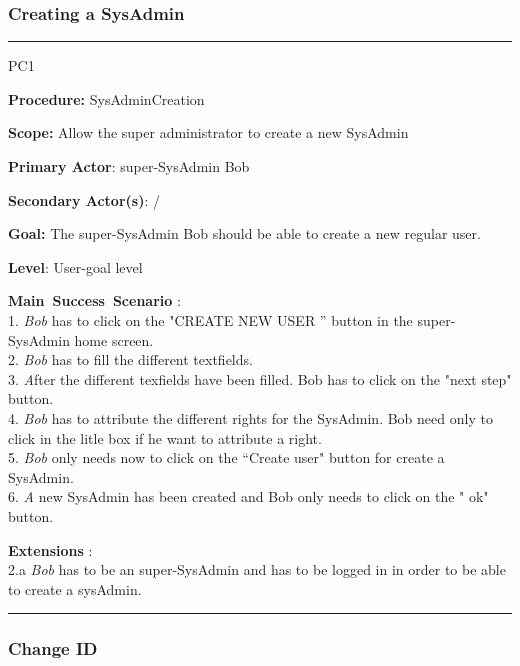 \subsubsection{Creating a SysAdmin}

\hrule
\vspace{0.5cm}
\begin{lyxlist}{PC1}
\small{
\item [\textbf{Procedure:}] SysAdminCreation 
\item [\textbf{Scope:}] Allow the super administrator to create a new SysAdmin
\item [\textbf{Primary Actor}:] super-SysAdmin Bob
\item [\textbf{Secondary Actor(s)}:] /
\item [\textbf{Goal:}] The super-SysAdmin Bob should be able to create a new
regular user.
\item [\textbf{Level}:] User-goal level
\item [\textbf{Main~Success~Scenario}]:\\
1. \emph{Bob} has to click on the "CREATE NEW USER '' button in the super-SysAdmin home
screen.\\
2. \emph{Bob} has to fill the different textfields.\\
3. \emph After the different texfields have been filled. {Bob} has to click on
the "next step" button.\\
4. \emph{Bob} has to attribute the different rights for the SysAdmin.
{Bob} need only to click in the litle box if he want to attribute a right.\\
5. \emph{Bob} only needs now to click on the ``Create user" button for create a
SysAdmin.
\\
6. \emph A new SysAdmin has been created and {Bob} only needs to click
on the " ok" button.\\

\item [\textbf{Extensions}]:\\
2.a \emph{Bob} has to be an super-SysAdmin and has to be logged in in order to
be able to create a sysAdmin.\\
}
\end{lyxlist}
\hrule


\subsubsection{Change ID}


